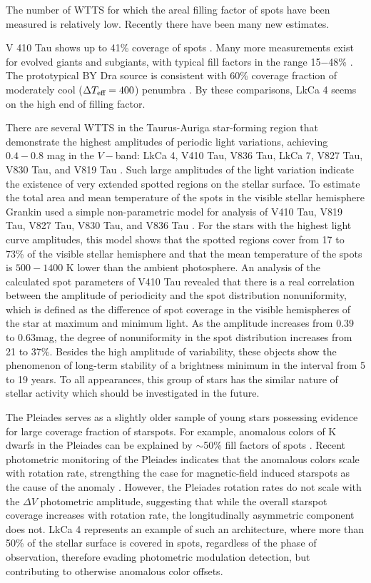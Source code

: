 \documentclass[twocolumn]{emulateapj}%
\begin{document}
The number of WTTS for which the areal filling factor of spots have been measured is relatively low.  Recently there have been many new estimates.

V 410 Tau shows up to 41\% coverage of spots \citep{petrov94}.  Many more measurements exist for evolved giants and subgiants, with typical fill factors in the range 15$-$48\% \citep{berdyugina05}.  The prototypical BY Dra source is consistent with 60\% coverage fraction of moderately cool ($\Delta T_\textrm{eff} =400$) penumbra \citep{chugainov76}.  By these comparisons, LkCa 4 seems on the high end of filling factor.

There are several WTTS in the Taurus-Auriga star-forming region that demonstrate the highest amplitudes of periodic light variations, achieving $0.4−0.8$ mag in the $V-$band: LkCa 4, V410 Tau, V836 Tau, LkCa 7, V827 Tau, V830 Tau, and V819 Tau \citep{grankin08}.  Such large amplitudes of the light variation indicate the existence of very extended spotted regions on the stellar surface. To estimate the total area and mean temperature of the spots in the visible stellar hemisphere Grankin used a simple non-parametric model for analysis of V410 Tau, V819 Tau, V827 Tau, V830 Tau, and V836 Tau \citep{1998AstL...24..497G,1999AstL...25..526G}. For the stars with the highest light curve amplitudes, this model shows that the spotted regions cover from 17 to 73\% of the visible stellar hemisphere and that the mean temperature of the spots is $500−1400$ K lower than the ambient photosphere.  An analysis of the calculated spot parameters of V410 Tau revealed that there is a real correlation between the amplitude of periodicity and the spot distribution
nonuniformity, which is defined as the difference of spot coverage in the visible hemispheres of the star at maximum and minimum light. As the amplitude increases from 0.39 to 0.63mag, the degree of nonuniformity in the spot distribution increases from 21 to 37\%. Besides the high amplitude of variability, these objects show the phenomenon of long-term stability of a brightness minimum in the interval from 5 to 19 years.  To all appearances, this group of stars has the similar nature of stellar activity which
should be investigated in the future.

The Pleiades serves as a slightly older sample of young stars possessing evidence for large coverage fraction of starspots.  For example, anomalous colors of K dwarfs in the Pleiades can be explained by $\sim$50\% fill factors of spots \citep{stauffer03}.  Recent photometric monitoring of the Pleiades indicates that the anomalous colors scale with rotation rate, strengthing the case for magnetic-field induced starspots as the cause of the anomaly \citep{covey16}.  However, the \citet{covey16} Pleiades rotation rates do not scale with the $\Delta V$ photometric amplitude, suggesting that while the overall starspot coverage increases with rotation rate, the longitudinally asymmetric component does not.  LkCa 4 represents an example of such an architecture, where more than 50\% of the stellar surface is covered in spots, regardless of the phase of observation, therefore evading photometric modulation detection, but contributing to otherwise anomalous color offsets.
\end{document}
